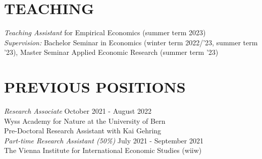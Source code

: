 \documentclass[margin, 12pt]{res} %
\begin{document}
\begin{resume}
		
		
		\section{TEACHING}
		{\sl Teaching Assistant} for Empirical Economics (summer term 2023)\\
		{\sl Supervision:} Bachelor Seminar in Economics (winter term 2022/'23, summer term '23), Master Seminar Applied Economic Research (summer term '23)

		
		\section{PREVIOUS POSITIONS}
		{\sl Research Associate} \hfill October 2021 - August 2022\\ Wyss Academy for Nature at the University of Bern\\
		Pre-Doctoral Research Assistant with Kai Gehring \vspace{0.2cm} \\
		{\sl Part-time Research Assistant (50\%)} \hfill July 2021 - September 2021\\
		The Vienna Institute for International Economic Studies (wiiw)
		

\end{resume}
\end{document}
